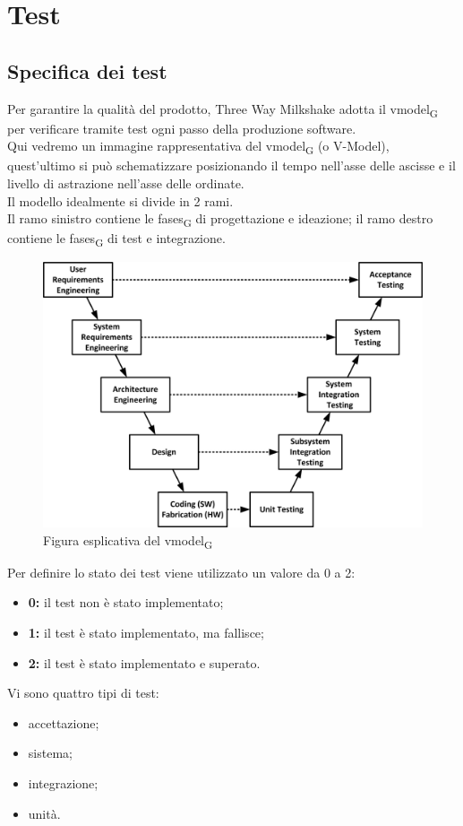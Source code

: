 
\section{Test}

\subsection{Specifica dei test}

Per garantire la qualità del prodotto, Three Way Milkshake adotta il \gls{vmodel}\textsubscript{G} per verificare tramite test ogni passo della produzione software.\\Qui vedremo un immagine rappresentativa del \gls{vmodel}\textsubscript{G} (o V-Model), quest'ultimo si può schematizzare posizionando il tempo nell'asse delle ascisse e il livello di astrazione nell'asse delle ordinate.\\Il modello idealmente si divide in 2 rami.\\Il ramo sinistro contiene le \glspl{fase}\textsubscript{G} di progettazione e ideazione; il ramo destro contiene le \glspl{fase}\textsubscript{G} di test e integrazione.
\begin{figure}[h!]
	\centering
	\includegraphics[scale=0.6]{res/images/v_model.jpg}
	\caption{Figura esplicativa del \gls{vmodel}\textsubscript{G}}
\end{figure}

Per definire lo stato dei test viene utilizzato un valore da 0 a 2:
\begin{itemize}
	\item \textbf{0:} il test non è stato implementato;
	\item \textbf{1:} il test è stato implementato, ma fallisce;
	\item \textbf{2:} il test è stato implementato e superato.
\end{itemize}
Vi sono quattro tipi di test:
\begin{itemize}
	\item accettazione;
	\item sistema;
	\item integrazione;
	\item unità.
\end{itemize}

